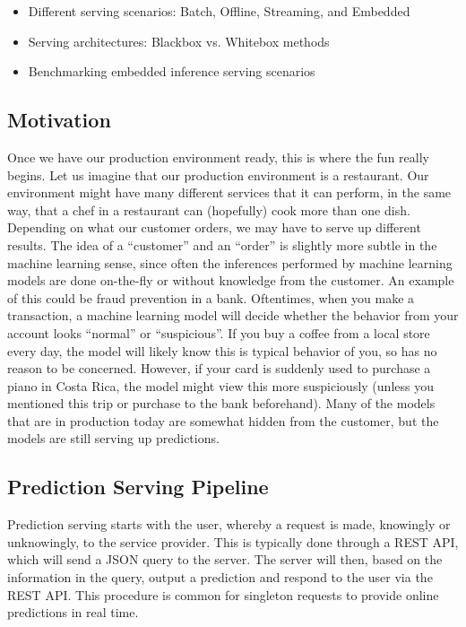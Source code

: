 {{{{{{    \begin{itemize}
      \item  Different serving scenarios: Batch, Offline, Streaming, and Embedded
      \item Serving architectures: Blackbox vs. Whitebox methods
      \item Benchmarking embedded inference serving scenarios
    \end{itemize}
    
    \subsection{Motivation}
    
    Once we have our production environment ready, this is where the fun really begins. Let us imagine that our production environment is a restaurant. Our environment might have many different services that it can perform, in the same way, that a chef in a restaurant can (hopefully) cook more than one dish. Depending on what our customer orders, we may have to serve up different results. The idea of a “customer” and an “order” is slightly more subtle in the machine learning sense, since often the inferences performed by machine learning models are done on-the-fly or without knowledge from the customer. An example of this could be fraud prevention in a bank. Oftentimes, when you make a transaction, a machine learning model will decide whether the behavior from your account looks “normal” or “suspicious”. If you buy a coffee from a local store every day, the model will likely know this is typical behavior of you, so has no reason to be concerned. However, if your card is suddenly used to purchase a piano in Costa Rica, the model might view this more suspiciously (unless you mentioned this trip or purchase to the bank beforehand). Many of the models that are in production today are somewhat hidden from the customer, but the models are still serving up predictions.
    
    \subsection{Prediction Serving Pipeline}
    
    Prediction serving starts with the user, whereby a request is made, knowingly or unknowingly, to the service provider. This is typically done through a REST API, which will send a JSON query to the server. The server will then, based on the information in the query, output a prediction and respond to the user via the REST API. This procedure is common for singleton requests to provide online predictions in real time.
    
}}}}}}
